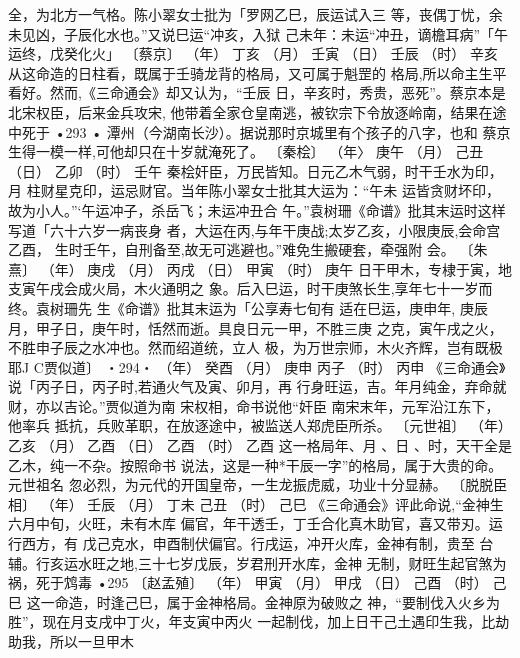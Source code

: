全，为北方一气格。陈小翠女士批为「罗网乙巳，辰运试入三
等，丧偶丁忧，余未见凶，子辰化水也。”又说巳运“冲亥，入狱
己未年：未运“冲丑，谪檐耳病”「午运终，戊癸化火」
〔蔡京〕
（年） 丁亥
（月） 壬寅
（日） 壬辰
（时） 辛亥
从这命造的日柱看，既属于壬骑龙背的格局，又可属于魁罡的
格局,所以命主生平看好。然而,《三命通会》却又认为，“壬辰
日，辛亥时，秀贵，恶死”。蔡京本是北宋权臣，后来金兵攻宋,
他带着全家仓皇南逃，被钦宗下令放逐岭南，结果在途中死于
•293 •
潭州（今湖南长沙）。据说那时京城里有个孩子的八字，也和
蔡京生得一模一样,可他却只在十岁就淹死了。
〔秦桧〕
（年〉 庚午
（月） 己丑
（日） 乙卯
（时） 壬午
秦桧奸臣，万民皆知。日元乙木气弱，时干壬水为印，月
柱财星克印，运忌财官。当年陈小翠女士批其大运为：“午未
运皆贪财坏印，故为小人。”‘午运冲子，杀岳飞；未运冲丑合
午。”袁树珊《命谱》批其末运时这样写道「六十六岁一病丧身
者，大运在丙,与年干庚战;太岁乙亥，小限庚辰,会命宫乙酉，
生时壬午，自刑备至,故无可逃避也。”难免生搬硬套，牵强附
会。
〔朱熹〕
（年） 庚戌
（月） 丙戌
（日） 甲寅
（时） 庚午
日干甲木，专棣于寅，地支寅午戌会成火局，木火通明之
象。后入巳运，时干庚煞长生,享年七十一岁而终。袁树珊先
生《命谱》批其末运为「公享寿七旬有 适在巳运，庚申年,
庚辰月，甲子日，庚午时，恬然而逝。具良日元一甲，不胜三庚
之克，寅午戌之火，不胜申子辰之水冲也。然而绍道统，立人
极，为万世宗师，木火齐辉，岂有既极耶J
C贾似道〕
・294・
（年） 癸酉
（月） 庚申
丙子
（时） 丙申
《三命通会》说「丙子日，丙子时,若通火气及寅、卯月，再
行身旺运，吉。年月纯金，弃命就财，亦以吉论。”贾似道为南
宋权相，命书说他“奸臣 南宋末年，元军沿江东下，他率兵
抵抗，兵败革职，在放逐途中，被监送人郑虎臣所杀。
〔元世祖〕
（年） 乙亥
（月） 乙酉
（日） 乙酉
（时） 乙酉
这一格局年、月 、日 、时，天干全是乙木，纯一不杂。按照命书
说法，这是一种*干辰一字”的格局，属于大贵的命。元世祖名
忽必烈，为元代的开国皇帝，一生龙振虎威，功业十分显赫。
〔脱脱臣相〕
（年） 壬辰
（月） 丁未
己丑
（时） 己巳
《三命通会》评此命说,“金神生六月中旬，火旺，未有木库
偏官，年干透壬，丁壬合化真木助官，喜又带刃。运行西方，有
戊己克水，申酉制伏偏官。行戌运，冲开火库，金神有制，贵至
台辅。行亥运水旺之地,三十七岁戊辰，岁君刑开水库，金神
无制，财旺生起官煞为祸，死于鸩毒
•295
〔赵孟殖〕
（年） 甲寅
（月） 甲戌
（日） 己酉
（时） 己巳
这一命造，时逢己巳，属于金神格局。金神原为破败之
神，“要制伐入火乡为胜”，现在月支戌中丁火，年支寅中丙火
一起制伐，加上日干己土遇印生我，比劫助我，所以一旦甲木
